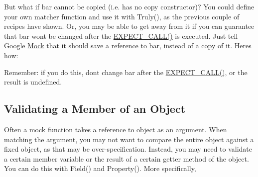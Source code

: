 But what if {\ttfamily bar} cannot be copied (i.\+e. has no copy constructor)? You could define your own matcher function and use it with {\ttfamily Truly()}, as the previous couple of recipes have shown. Or, you may be able to get away from it if you can guarantee that {\ttfamily bar} won\textquotesingle{}t be changed after the {\ttfamily \mbox{\hyperlink{googletest-master_2googlemock_2include_2gmock_2gmock-spec-builders_8h_a535a6156de72c1a2e25a127e38ee5232}{E\+X\+P\+E\+C\+T\+\_\+\+C\+A\+L\+L()}}} is executed. Just tell Google \mbox{\hyperlink{class_mock}{Mock}} that it should save a reference to {\ttfamily bar}, instead of a copy of it. Here\textquotesingle{}s how\+:


\begin{DoxyCode}{0}
\DoxyCodeLine{  \textcolor{comment}{// Expects that Foo()'s argument == bar.}}
\DoxyCodeLine{}
\DoxyCodeLine{  \textcolor{comment}{// Expects that Foo()'s argument < bar.}}
\end{DoxyCode}


Remember\+: if you do this, don\textquotesingle{}t change {\ttfamily bar} after the {\ttfamily \mbox{\hyperlink{googletest-master_2googlemock_2include_2gmock_2gmock-spec-builders_8h_a535a6156de72c1a2e25a127e38ee5232}{E\+X\+P\+E\+C\+T\+\_\+\+C\+A\+L\+L()}}}, or the result is undefined.

\subsection*{Validating a Member of an Object}

Often a mock function takes a reference to object as an argument. When matching the argument, you may not want to compare the entire object against a fixed object, as that may be over-\/specification. Instead, you may need to validate a certain member variable or the result of a certain getter method of the object. You can do this with {\ttfamily Field()} and {\ttfamily Property()}. More specifically,


